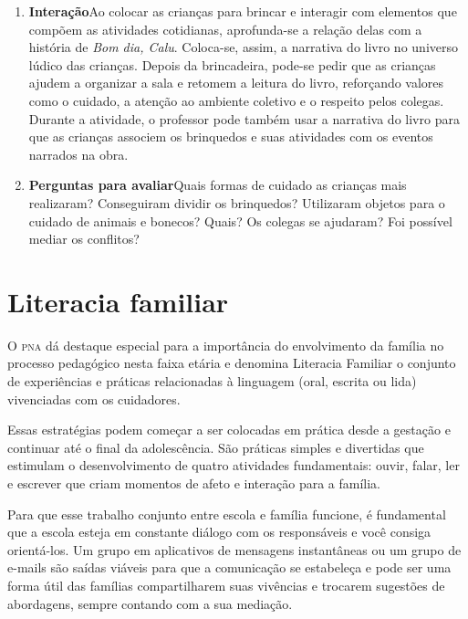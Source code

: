 \documentclass[11pt]{extarticle}
\begin{document}
\begin{enumerate}

\item \textbf{Interação}\quad Ao colocar as crianças para brincar e interagir com elementos que compõem as atividades cotidianas, aprofunda-se a relação delas com a história de \textit{Bom dia, Calu}. Coloca-se, assim, a narrativa do livro no universo lúdico das crianças. Depois da brincadeira, pode-se pedir que as crianças ajudem a organizar a sala e retomem a leitura do livro, reforçando valores como o cuidado, a atenção ao ambiente coletivo e o respeito pelos colegas. Durante a atividade, o professor pode também usar a narrativa do livro para que as crianças associem os brinquedos e suas atividades com os eventos narrados na obra.

\item \textbf{Perguntas para avaliar}\quad Quais formas de cuidado as crianças mais realizaram? Conseguiram dividir os brinquedos? Utilizaram  objetos para o cuidado de animais e bonecos? Quais? Os colegas se ajudaram? Foi possível mediar os conflitos?
\end{enumerate}

\section{Literacia familiar}
O \textsc{pna} dá destaque especial para a importância do envolvimento da família 
no processo pedagógico nesta faixa etária e denomina Literacia Familiar o conjunto 
de experiências e práticas relacionadas à linguagem (oral, escrita ou lida) vivenciadas 
com os cuidadores. 

Essas estratégias podem começar a ser colocadas em prática desde a 
gestação e continuar até o final da adolescência. São práticas simples e divertidas 
que estimulam o desenvolvimento de quatro atividades fundamentais: ouvir, falar, 
ler e escrever que criam momentos de afeto e interação para a família. 

Para que esse trabalho conjunto entre escola e família funcione, é 
fundamental que a escola esteja em constante diálogo com os responsáveis e 
você consiga orientá-los. Um grupo em aplicativos de mensagens instantâneas ou um 
grupo de e-mails são saídas viáveis para que a comunicação se estabeleça e pode ser 
uma forma útil das famílias compartilharem suas vivências e trocarem sugestões 
de abordagens, sempre contando com a sua mediação. 
\end{document}
